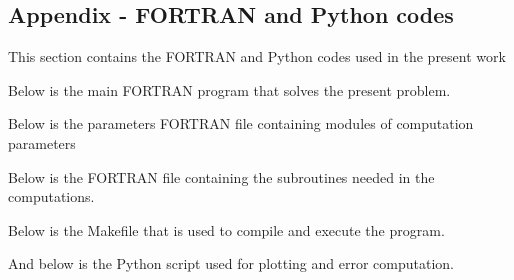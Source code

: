 \documentclass[conf]{new-aiaa}
\begin{document}
\begin{appendices}
    \section{Appendix - FORTRAN and Python codes}\label{appendixA}
    This section contains the FORTRAN and Python codes used in the present work \\
    \par Below is the main FORTRAN program that solves the present problem.

    

    \par Below is the parameters FORTRAN file containing modules of computation parameters
    

    \par Below is the FORTRAN file containing the subroutines needed in the computations.
    

    \par Below is the Makefile that is used to compile and execute the program.
    

    \par And below is the Python script used for plotting and error computation.
    

\end{appendices}

\par
\center{**********}
\end{document}
